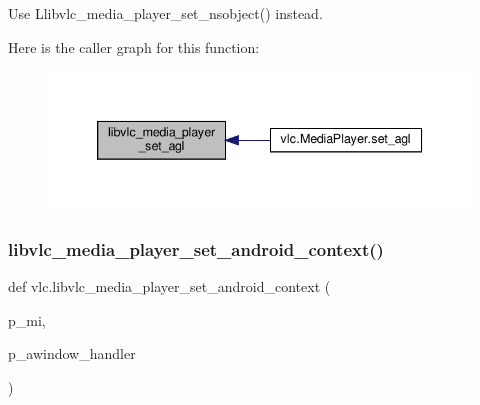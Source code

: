 \begin{DoxyVerb}\deprecated Use L{libvlc_media_player_set_nsobject}() instead.
\end{DoxyVerb}
 Here is the caller graph for this function\+:
\nopagebreak
\begin{figure}[H]
\begin{center}
\leavevmode
\includegraphics[width=339pt]{namespacevlc_a71a776d5201caa9efb0f154678044ce7_icgraph}
\end{center}
\end{figure}
\mbox{\label{namespacevlc_ae9303e0d1bd96d748e62523a28d6c391}} 
\subsubsection{\texorpdfstring{libvlc\+\_\+media\+\_\+player\+\_\+set\+\_\+android\+\_\+context()}{libvlc\_media\_player\_set\_android\_context()}}
{\footnotesize\ttfamily def vlc.\+libvlc\+\_\+media\+\_\+player\+\_\+set\+\_\+android\+\_\+context (\begin{DoxyParamCaption}\item[{}]{p\+\_\+mi,  }\item[{}]{p\+\_\+awindow\+\_\+handler }\end{DoxyParamCaption})}

